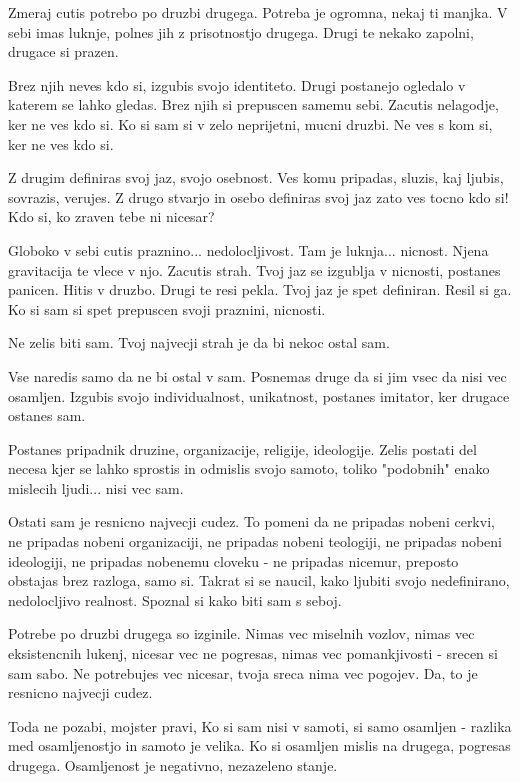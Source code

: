         

   Zmeraj cutis potrebo po druzbi drugega. Potreba je ogromna, nekaj ti manjka. V sebi imas luknje, polnes jih z prisotnostjo drugega. Drugi te nekako zapolni, drugace si prazen. 

Brez njih neves kdo si, izgubis svojo identiteto. Drugi postanejo ogledalo v katerem se lahko gledas. Brez njih si prepuscen samemu sebi. Zacutis nelagodje, ker ne ves kdo si. Ko si sam si v zelo neprijetni, mucni druzbi. Ne ves s kom si, ker ne ves kdo si. 

Z drugim definiras svoj jaz, svojo osebnost. Ves komu pripadas, sluzis, kaj ljubis, sovrazis, verujes. Z drugo stvarjo in osebo definiras svoj jaz zato ves tocno kdo si! Kdo si, ko zraven tebe ni nicesar? 

Globoko v sebi cutis praznino... nedolocljivost. Tam je luknja... nicnost. Njena gravitacija te vlece v njo. Zacutis strah. Tvoj jaz se izgublja v nicnosti, postanes panicen. Hitis v druzbo. Drugi te resi pekla. Tvoj jaz je spet definiran. Resil si ga. Ko si sam si spet prepuscen svoji praznini, nicnosti. 

Ne zelis biti sam. Tvoj najvecji strah je da bi nekoc ostal sam. 

Vse naredis samo da ne bi ostal v sam. Posnemas druge da si jim vsec da nisi vec osamljen. Izgubis svojo individualnost, unikatnost, postanes imitator, ker drugace ostanes sam. 

Postanes pripadnik druzine, organizacije, religije, ideologije. Zelis postati del necesa kjer se lahko sprostis in odmislis svojo samoto, toliko "podobnih" enako mislecih ljudi... nisi vec sam. 

Ostati sam je resnicno najvecji cudez. To pomeni da ne pripadas nobeni cerkvi, ne pripadas nobeni organizaciji, ne pripadas nobeni teologiji, ne pripadas nobeni ideologiji, ne pripadas nobenemu cloveku - ne pripadas nicemur, preposto obstajas brez razloga, samo si. Takrat si se naucil, kako ljubiti svojo nedefinirano, nedolocljivo realnost. Spoznal si kako biti sam s seboj. 

Potrebe po druzbi drugega so izginile. Nimas vec miselnih vozlov, nimas vec eksistencnih lukenj, nicesar vec ne pogresas, nimas vec pomankjivosti - srecen si sam sabo. Ne potrebujes vec nicesar, tvoja sreca nima vec pogojev. Da, to je resnicno najvecji cudez. 

Toda ne pozabi, mojster pravi,  Ko si sam nisi v samoti, si samo osamljen - razlika med osamljenostjo in samoto je velika. Ko si osamljen mislis na drugega, pogresas drugega. Osamljenost je negativno, nezazeleno stanje. 

